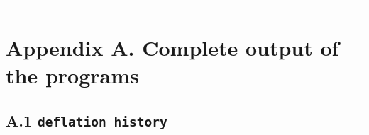 \documentclass[
  10pt,
]{article}
\begin{document}
\begin{center}\rule{0.5\linewidth}{0.5pt}\end{center}

\hypertarget{appendix-a.-complete-output-of-the-programs}{%
\section{Appendix A. Complete output of the
programs}\label{appendix-a.-complete-output-of-the-programs}}

\hypertarget{a.1-deflation-history}{%
\subsection{\texorpdfstring{A.1
\texttt{deflation\ history}}{A.1 deflation history}}\label{a.1-deflation-history}}
\end{document}
